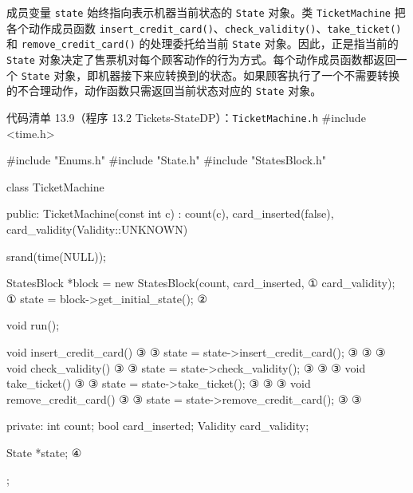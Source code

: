 
成员变量 \texttt{state} 始终指向表示机器当前状态的 \texttt{State} 对象。类 \texttt{Ticket\allowbreak{}Machine} 把各个动作成员函数 \texttt{insert\_\allowbreak{}credit\_\allowbreak{}card(\allowbreak{})\allowbreak{}}、\texttt{check\_\allowbreak{}validity(\allowbreak{})\allowbreak{}}、\texttt{take\_\allowbreak{}ticket(\allowbreak{})\allowbreak{}} 和 \texttt{remove\_\allowbreak{}credit\_\allowbreak{}card(\allowbreak{})\allowbreak{}} 的处理委托给当前 \texttt{State} 对象。因此，正是指当前的 \texttt{State} 对象决定了售票机对每个顾客动作的行为方式。每个动作成员函数都返回一个 \texttt{State} 对象，即机器接下来应转换到的状态。如果顾客执行了一个不需要转换的不合理动作，动作函数只需返回当前状态对应的 \texttt{State} 对象。

\begin{codeboxt}{代码清单 13.9（程序 13.2 Tickets-StateDP）：\texttt{Ticket\allowbreak{}Machine.\allowbreak{}h}}
#include <time.h>

#include "Enums.h"
#include "State.h"
#include "StatesBlock.h"

class TicketMachine
{
public:
    TicketMachine(const int c)
        : count(c), card_inserted(false),
          card_validity(Validity::UNKNOWN)
    {
        srand(time(NULL));

        StatesBlock *block = new StatesBlock(count, card_inserted,  ①
                                                    card_validity); ①
        state = block->get_initial_state();                         ②

    }

    void run();

    void insert_credit_card()                                       ③
    {                                                               ③
        state = state->insert_credit_card();                        ③
    }                                                               ③
                                                                    ③
    void check_validity()                                           ③
    {                                                               ③
        state = state->check_validity();                            ③
    }                                                               ③
                                                                    ③
    void take_ticket()                                              ③
    {                                                               ③
        state = state->take_ticket();                               ③
    }                                                               ③
                                                                    ③
    void remove_credit_card()                                       ③
    {                                                               ③
        state = state->remove_credit_card();                        ③
    }                                                               ③

private:
    int      count;
    bool     card_inserted;
    Validity card_validity;

    State *state;                                                   ④
};
\end{codeboxt}
